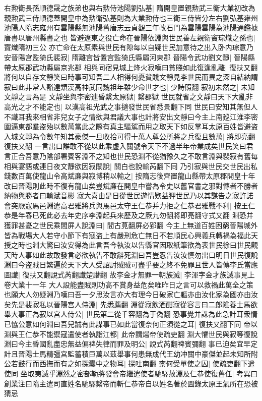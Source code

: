 右勲衛長孫順德晟之族弟也與右勲侍池陽劉弘基|{
	隋開皇置親勲武三衛大業初改為親勲武三侍順德蓋開皇中為勲衛弘基則為大業勲侍也三衛三侍皆分左右劉弘基雍州池陽人隋志雍州有雲陽縣無池陽舊唐志云貞觀三年改石門為雲陽雲陽為池陽通鑑據唐書以唐州縣書之也}
皆避遼東之役亡命在晉陽依淵與世民善左親衛竇琮熾之孫也|{
	竇熾隋初三公}
亦亡命在太原素與世民有隙每以自疑世民加意待之出入卧内琮意乃安晉陽宫監猗氏裴寂|{
	隋離宫皆置宫監猗氏縣屬河東郡}
晉陽令武功劉文靜|{
	晉陽縣帶太原郡武功縣屬京兆郡}
相與同宿見城上烽火寂嘆曰貧賤如此復逢亂離|{
	復扶又翻}
將何以自存文靜笑曰時事可知吾二人相得何憂貧賤文靜見李世民而異之深自結納謂寂曰此非常人豁達類漢高神武同魏祖年雖少命世才也|{
	少詩照翻}
寂初未然之|{
	未知文靜之言為是}
文靜坐與李密連昏繫太原獄|{
	繫郡獄}
世民就省之文靜曰天下大亂非高光之才不能定也|{
	以漢高祖光武之事擿發世民省悉景翻下同}
世民曰安知其無但人不識耳我來相省非兒女子之情欲與君議大事也計將安出文靜曰今主上南廵江淮李密圍逼東都羣盗殆以數萬當此之際有真主驅駕而用之取天下如反掌耳太原百姓皆避盗入城文靜為令數年知其豪傑一旦收拾可得十萬人尊公所將之兵復且數萬|{
	將即亮翻復扶又翻}
一言出口誰敢不從以此乘虚入關號令天下不過半年帝業成矣世民笑曰君言正合吾意乃隂部署賓客淵不之知也世民恐淵不從猶豫久之不敢言淵與裴寂有舊每相與宴語或連日夜文靜欲因寂關說|{
	關白也說輸芮翻下同}
乃引寂與世民交世民出私錢數百萬使龍山令高斌亷與寂博稍以輸之|{
	按隋志後齊置龍山縣帶太原郡開皇十年改曰晉陽則此時不復有龍山矣豈斌亷在開皇中嘗為令史以舊官書之邪對慱者不勝者納物與勝者曰輸斌音彬}
寂大喜由是日從世民遊情欵益狎世民乃以其謀告之寂許諾會突厥寇馬邑淵遣高君雅將兵與馬邑太守王仁恭并力拒之仁恭君雅戰不利|{
	按王仁恭是年春已死此必去年史序李淵起兵來歷及之厥九勿翻將即亮翻守式又翻}
淵恐并獲罪甚憂之世民乘間屏人說淵曰|{
	間古莧翻屏必郢翻}
今主上無道百姓困窮晉陽城外皆為戰場大人若守小節下有寇盗上有嚴刑危亡無日不若順民心興義兵轉禍為福此天授之時也淵大驚曰汝安得為此言吾今執汝以告縣官因取紙筆欲為表世民徐曰世民觀天時人事如此故敢發言必欲執告不敢辭死淵曰吾豈忍告汝汝慎勿出口明日世民復說淵曰今盗賊日繁遍於天下大人受詔討賊賊可盡乎要之終不免罪且世人皆傳李氏當應圖䜟|{
	復扶又翻說式芮翻䜟楚譖翻}
故李金才無罪一朝族滅|{
	李渾字金才族滅事見上卷大業十一年}
大人設能盡賊則功高不賞身益危矣唯昨日之言可以救禍此萬全之策也願大人勿疑淵乃嘆曰吾一夕思汝言亦大有理今日破家亡軀亦由汝化家為國亦由汝矣先是裴寂私以晉陽宫人侍淵|{
	先悉薦翻}
淵從寂飲酒酣寂從容言曰二郎隂養士馬欲舉大事正為寂以宫人侍公|{
	世民第二從千容翻為于偽翻}
恐事覺并誅為此急計耳衆情已恊公意如何淵曰吾兒誠有此謀事已如此當復奈何正須從之耳|{
	復扶又翻下同}
帝以淵與王仁恭不能禦寇遣使者執詣江都|{
	此帝謂煬帝使疏吏翻}
淵大懼世民與寂等復說淵曰今主昏國亂盡忠無益偏禆失律而罪及明公|{
	說式芮翻禆賓彌翻}
事已迫矣宜早定計且晉陽士馬精彊宫監蓄積巨萬以茲舉事何患無成代王幼冲關中豪傑並起未知所附公若鼓行而西撫而有之如探囊中之物耳|{
	探吐南翻}
柰何受單使之囚|{
	使疏吏翻下遣使同}
坐取夷滅乎淵然之密部勒將發會帝繼遣使者馳驛赦淵及仁恭使復舊任|{
	考異曰創業注曰隋主遣司直姓名馳驛繫帝而斬仁恭帝自以姓名著於圖錄太原王氣所在恐被猜忌}


